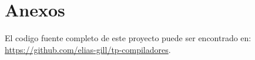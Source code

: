 \documentclass[12pt,a4paper]{article}
\begin{document}

\begin{titlepage}
	
\end{titlepage}
\newpage


\tableofcontents
\newpage








\section{Anexos}
El codigo fuente completo de este proyecto puede ser encontrado en:
\href{https://github.com/elias-gill/tp-compiladores}{https://github.com/elias-gill/tp-compiladores}.

\end{document}
